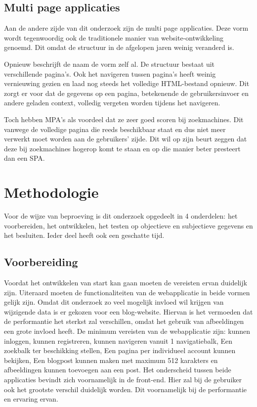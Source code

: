 \documentclass{hogent-article}
\begin{document}
\subsection{Multi page applicaties}
Aan de andere zijde van dit onderzoek zijn de multi page applicaties.
Deze vorm wordt tegenwoordig ook de traditionele manier van website-ontwikkeling genoemd.
Dit omdat de structuur in de afgelopen jaren weinig veranderd is.

Opnieuw beschrijft de naam de vorm zelf al.
De structuur bestaat uit verschillende pagina's.
Ook het navigeren tussen pagina's heeft weinig vernieuwing gezien en laad nog steeds het volledige HTML-bestand opnieuw.
Dit zorgt er voor dat de gegevens op een pagina, betekenende de gebruikersinvoer en andere geladen context, volledig vergeten worden tijdens het navigeren.

Toch hebben MPA's als voordeel dat ze zeer goed scoren bij zoekmachines.
Dit vanwege de volledige pagina die reeds beschikbaar staat en dus niet meer verwerkt moet worden aan de gebruikers' zijde.
Dit wil op zijn beurt zeggen dat deze bij zoekmachines hogerop komt te staan en op die manier beter presteert dan een SPA.


\section{Methodologie}
Voor de wijze van beproeving is dit onderzoek opgedeelt in 4 onderdelen: het voorbereiden, het ontwikkelen, het testen op objectieve en subjectieve gegevens en het besluiten.
Ieder deel heeft ook een geschatte tijd.

\subsection{Voorbereiding}
Voordat het ontwikkelen van start kan gaan moeten de vereisten ervan duidelijk zijn.
Uiteraard moeten de functionaliteiten van de webapplicatie in beide vormen gelijk zijn.
Omdat dit onderzoek zo veel mogelijk invloed wil krijgen van wijzigende data is er gekozen voor een blog-website.
Hiervan is het vermoeden dat de performantie het sterkst zal verschillen, omdat het gebruik van afbeeldingen een grote invloed heeft.
De minimum vereisten van de webapplicatie zijn:
kunnen inloggen,
kunnen registreren,
kunnen navigeren vanuit 1 navigatiebalk,
Een zoekbalk ter beschikking stellen,
Een pagina per individueel account kunnen bekijken,
Een blogpost kunnen maken met maximum 512 karakters
en afbeeldingen kunnen toevoegen aan een post.
Het onderscheid tussen beide applicaties bevindt zich voornamelijk in de front-end.
Hier zal bij de gebruiker ook het grootste verschil duidelijk worden.
Dit voornamelijk bij de performantie en ervaring ervan.
\end{document}
